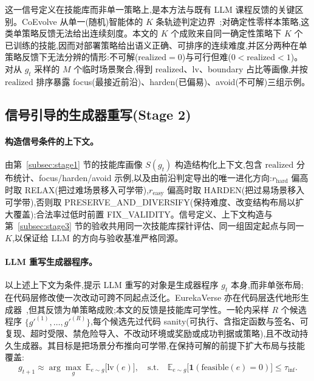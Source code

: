 \documentclass[11pt,a4paper,fontset=noto]{ctexart}
\newcommand{\feasible}{\mathrm{feasible}}
\newcommand{\realized}{\mathrm{realized}}
\newcommand{\lv}{\mathrm{lv}}
\begin{document}
这一信号定义在技能库而非单一策略上,是本方法与既有 LLM 课程反馈的关键区别。CoEvolve 从单一(随机)智能体的 $K$ 条轨迹判定边界~\citep{coevolve};对确定性零样本策略,这类单策略反馈无法给出连续刻度。本文的 $K$ 个成败来自同一确定性策略下 $K$ 个已训练的技能,因而对部署策略给出语义正确、可排序的连续难度,并区分两种在单策略反馈下无法分辨的情形:不可解($\realized=0$)与可行但难($0<\realized<1$)。对从 $g_t$ 采样的 $M$ 个临时场景聚合,得到 $\realized$、$\lv$、boundary 占比等画像,并按 $\realized$ 排序暴露 focus(最接近前沿)、harden(已偏易)、avoid(不可解)三组示例。

\subsection{信号引导的生成器重写(Stage 2)}
\label{subsec:stage2}

\paragraph{构造信号条件的上下文。}
由第~\ref{subsec:stage1} 节的技能库画像 $S(g_t)$ 构造结构化上下文,包含 $\realized$ 分布统计、focus/harden/avoid 示例,以及由前沿判定导出的唯一进化方向:$r_{\mathrm{hard}}$ 偏高时取 RELAX(把过难场景移入可学带),$r_{\mathrm{easy}}$ 偏高时取 HARDEN(把过易场景移入可学带),否则取 PRESERVE\_AND\_DIVERSIFY(保持难度、改变结构布局以扩大覆盖);合法率过低时前置 FIX\_VALIDITY。信号定义、上下文构造与第~\ref{subsec:stage3} 节的验收共用同一次技能库探针评估、同一组固定起点与同一 $K$,以保证给 LLM 的方向与验收基准严格同源。

\paragraph{LLM 重写生成器程序。}
以上述上下文为条件,提示 LLM 重写的对象是生成器程序 $g_t$ 本身,而非单张布局;在代码层修改使一次改动可跨不同起点泛化。EurekaVerse 亦在代码层迭代地形生成器~\citep{eurekaverse},但其反馈为单策略成败;本文的反馈是技能库可学性。一轮内采样 $R$ 个候选程序 $\{g'^{(1)},\dots,g'^{(R)}\}$,每个候选先过代码 sanity(可执行、含指定函数与签名、可复现、超时受限、禁危险导入、不改动环境或奖励或成功判据或策略),且不改动持久生成器。其目标是把场景分布推向可学带,在保持可解的前提下扩大布局与技能覆盖:
\begin{equation}
g_{t+1} \approx \arg\max_{g}\ \mathbb{E}_{e\sim g}\bigl[\lv(e)\bigr],
\quad \text{s.t.}\quad \mathbb{E}_{e\sim g}\bigl[\mathbf{1}(\feasible(e)=0)\bigr] \le \tau_{\mathrm{inf}}.
\label{eq:objective}
\end{equation}
\end{document}
